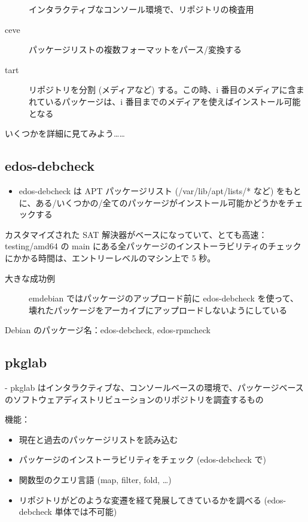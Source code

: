 \documentclass[mingoth,a4paper]{jsarticle}
\begin{document}
\begin{commandline}
\begin{description}
インタラクティブなコンソール環境で、リポジトリの検査用
\item[ceve] \mbox{}

パッケージリストの複数フォーマットをパース/変換する
\item[tart] \mbox{}

リポジトリを分割 (メディアなど) する。この時、i 番目のメディアに含まれているパッケージは、i 番目までのメディアを使えばインストール可能となる
\end{description}

いくつかを詳細に見てみよう……


\subsection{edos-debcheck}

\begin{itemize}
\item edos-debcheck は APT パッケージリスト (/var/lib/apt/lists/* など) をもとに、ある/いくつかの/全てのパッケージがインストール可能かどうかをチェックする
\end{itemize}

カスタマイズされた SAT 解決器がベースになっていて、とても高速：testing/amd64 の main にある全パッケージのインストーラビリティのチェックにかかる時間は、エントリーレベルのマシン上で 5 秒。

\begin{description}
\item[大きな成功例] \mbox{}

emdebian ではパッケージのアップロード前に edos-debcheck を使って、壊れたパッケージをアーカイブにアップロードしないようにしている
\end{description}

Debian のパッケージ名：edos-debcheck, edos-rpmcheck


\subsection{pkglab}

- pkglab はインタラクティブな、コンソールベースの環境で、パッケージベースのソフトウェアディストリビューションのリポジトリを調査するもの

機能：

\begin{itemize}
\item 現在と過去のパッケージリストを読み込む
\item パッケージのインストーラビリティをチェック (edos-debcheck で)
\item 関数型のクエリ言語 (map, filter, fold, \dots{})
\item リポジトリがどのような変遷を経て発展してきているかを調べる (edos-debcheck 単体では不可能)
\end{itemize}


\end{commandline}
\end{document}
